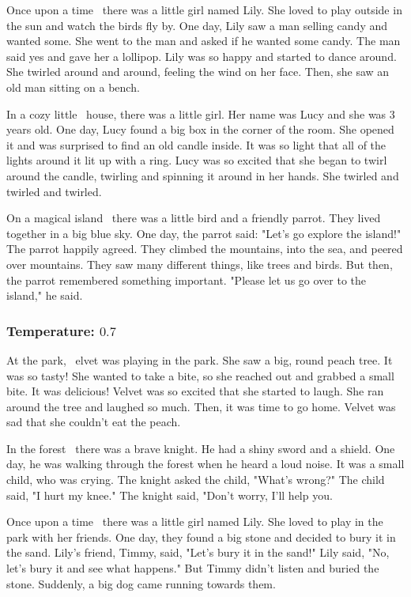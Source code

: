 \documentclass[11pt]{article}
\begin{document}
    Once upon a time \textellipsis\ there was a little girl named Lily. She loved to play outside in the sun and watch the birds fly by. One day, Lily saw a man selling candy and wanted some. She went to the man and asked if he wanted some candy. The man said yes and gave her a lollipop. Lily was so happy and started to dance around. She twirled around and around, feeling the wind on her face. Then, she saw an old man sitting on a bench.

    In a cozy little \textellipsis\ house, there was a little girl. Her name was Lucy and she was 3 years old. One day, Lucy found a big box in the corner of the room. She opened it and was surprised to find an old candle inside. It was so light that all of the lights around it lit up with a ring. Lucy was so excited that she began to twirl around the candle, twirling and spinning it around in her hands. She twirled and twirled and twirled.

    On a magical island \textellipsis\ there was a little bird and a friendly parrot. They lived together in a big blue sky. One day, the parrot said: "Let's go explore the island!" The parrot happily agreed. They climbed the mountains, into the sea, and peered over mountains. They saw many different things, like trees and birds. But then, the parrot remembered something important.  "Please let us go over to the island," he said.

    \subsubsection*{Temperature: $0.7$}

    At the park, \textellipsis\ elvet was playing in the park. She saw a big, round peach tree. It was so tasty! She wanted to take a bite, so she reached out and grabbed a small bite. It was delicious! Velvet was so excited that she started to laugh. She ran around the tree and laughed so much. Then, it was time to go home. Velvet was sad that she couldn't eat the peach.

    In the forest \textellipsis\ there was a brave knight. He had a shiny sword and a shield. One day, he was walking through the forest when he heard a loud noise. It was a small child, who was crying. The knight asked the child, "What's wrong?" The child said, "I hurt my knee." The knight said, "Don't worry, I'll help you.

    Once upon a time \textellipsis\ there was a little girl named Lily. She loved to play in the park with her friends. One day, they found a big stone and decided to bury it in the sand. Lily's friend, Timmy, said, "Let's bury it in the sand!" Lily said, "No, let's bury it and see what happens." But Timmy didn't listen and buried the stone. Suddenly, a big dog came running towards them.
\end{document}
